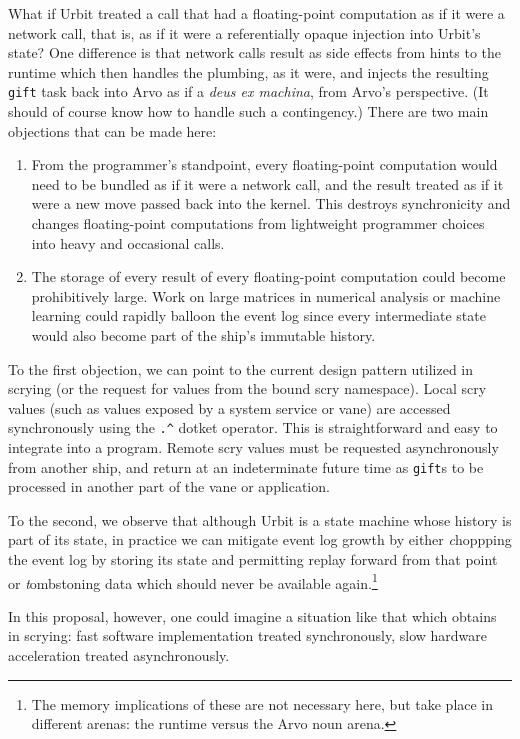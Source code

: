 \documentclass[twoside]{article}
\begin{document}
What if Urbit treated a call that had a floating-point computation as if it were a network call, that is, as if it were a referentially opaque injection into Urbit's state?  One difference is that network calls result as side effects from hints to the runtime which then handles the plumbing, as it were, and injects the resulting \texttt{gift} task back into Arvo as if a \emph{deus ex machina}, from Arvo's perspective.  (It should of course know how to handle such a contingency.)  There are two main objections that can be made here:

\begin{enumerate}
  \item  From the programmer's standpoint, every floating-point computation would need to be bundled as if it were a network call, and the result treated as if it were a new move passed back into the kernel.  This destroys synchronicity and changes floating-point computations from lightweight programmer choices into heavy and occasional calls.

  \item  The storage of every result of every floating-point computation could become prohibitively large.  Work on large matrices in numerical analysis or machine learning could rapidly balloon the event log since every intermediate state would also become part of the ship's immutable history.
\end{enumerate}

To the first objection, we can point to the current design pattern utilized in scrying (or the request for values from the bound scry namespace).  Local scry values (such as values exposed by a system service or vane) are accessed synchronously using the \texttt{.\^} dotket operator.  This is straightforward and easy to integrate into a program.  Remote scry values must be requested asynchronously from another ship, and return at an indeterminate future time as \texttt{gift}s to be processed in another part of the vane or application.

To the second, we observe that although Urbit is a state machine whose history is part of its state, in practice we can mitigate event log growth by either {\emph choppping} the event log by storing its state and permitting replay forward from that point or {\emph tombstoning} data which should never be available again.\footnote{The memory implications of these are not necessary here, but take place in different arenas:  the runtime versus the Arvo noun arena.}

In this proposal, however, one could imagine a situation like that which obtains in scrying:  fast software implementation treated synchronously, slow hardware acceleration treated asynchronously.
\end{document}
